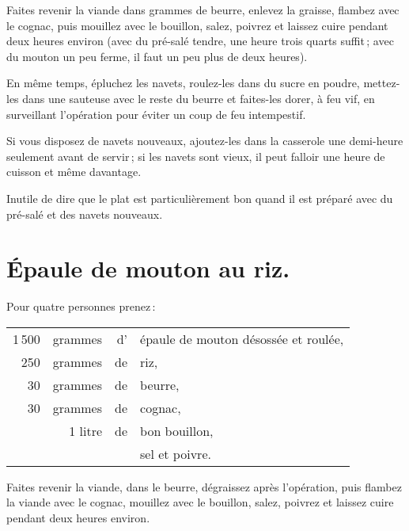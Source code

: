 Faites revenir la viande dans {\mmm} grammes de beurre, enlevez la graisse, flambez
avec le cognac, puis mouillez avec le bouillon, salez, poivrez et laissez cuire
pendant deux heures environ (avec du pré-salé tendre, une heure trois quarts
suffit ; avec du mouton un peu ferme, il faut un peu plus de deux heures).

En même temps, épluchez les navets, roulez-les dans du sucre en poudre,
mettez-les dans une sauteuse avec le reste du beurre et faites-les dorer, à feu
vif, en surveillant l'opération pour éviter un coup de feu intempestif.

Si vous disposez de navets nouveaux, ajoutez-les dans la casserole une
demi-heure seulement avant de servir ; si les navets sont vieux, il peut
falloir une heure de cuisson et même davantage.

Inutile de dire que le plat est particulièrement bon quand il est préparé avec
du pré-salé et des navets nouveaux.

\section*{\centering Épaule de mouton au riz.}
{}

Pour quatre personnes prenez :

\medskip

\footnotesize
\begin{longtable}{rrrp{16em}}
  1 500 & grammes & d' & épaule de mouton désossée et roulée,                                             \\
    250 & grammes & de & riz,                                                                             \\
     30 & grammes & de & beurre,                                                                          \\
     30 & grammes & de & cognac,                                                                          \\
        & 1 litre & de & bon bouillon,                                                                    \\
        &         &    & sel et poivre.                                                                   \\
\end{longtable}
\normalsize

Faites revenir la viande, dans le beurre, dégraissez après l'opération, puis
flambez la viande avec le cognac, mouillez avec le bouillon, salez, poivrez et
laissez cuire pendant deux heures environ.


